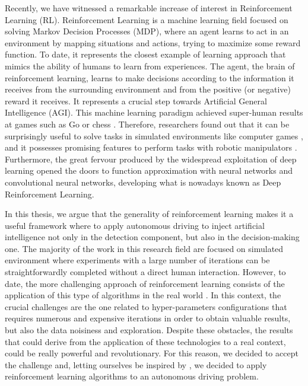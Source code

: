 Recently, we have witnessed a remarkable increase of interest in Reinforcement Learning (RL).
Reinforcement Learning is a machine learning field focused on solving Markov Decision Processes (MDP), where an agent learns to act in an environment by mapping situations and actions, trying to maximize some reward function.
To date, it represents the closest example of learning approach that mimics the ability of humans to learn from experiences.
The agent, the brain of reinforcement learning, learns to make decisions according to the information it receives from the surrounding environment and from the positive (or negative) reward it receives.
It represents a crucial step towards Artificial General Intelligence (AGI).
This machine learning paradigm achieved super-human results at games such as Go \cite{silver2016mastering} or chess \cite{silver2017mastering}.
Therefore, researchers found out that it can be surprisingly useful to solve tasks in simulated environments like computer games \cite{mnih2013playing}, and it possesses promising features to perform tasks with robotic manipulators \cite{gu2017deep}.
Furthermore, the great fervour produced by the widespread exploitation of deep learning opened the doors to function approximation with neural networks and convolutional neural networks, developing what is nowadays known as Deep Reinforcement Learning.

In this thesis, we argue that the generality of reinforcement learning makes it a useful framework where to apply autonomous driving to inject artificial intelligence not only in the detection component, but also in the decision-making one.
The majority of the work in this research field are focused on simulated environment where experiments with a large number of iterations can be straightforwardly completed without a direct human interaction.
However, to date, the more challenging approach of reinforcement learning consists of the application of this type of algorithms in the real world \cite{kendall2019nowisthetime}. In this context, the crucial challenges are the one related to hyper-parameters configurations that requires numerous and expensive iterations in order to obtain valuable results, but also the data noisiness and exploration.
Despite these obstacles, the results that could derive from the application of these technologies to a real context, could be really powerful and revolutionary.
For this reason, we decided to accept the challenge and, letting ourselves be inspired by \cite{kendall2018learning}, we decided to apply reinforcement learning algorithms to an autonomous driving problem.

